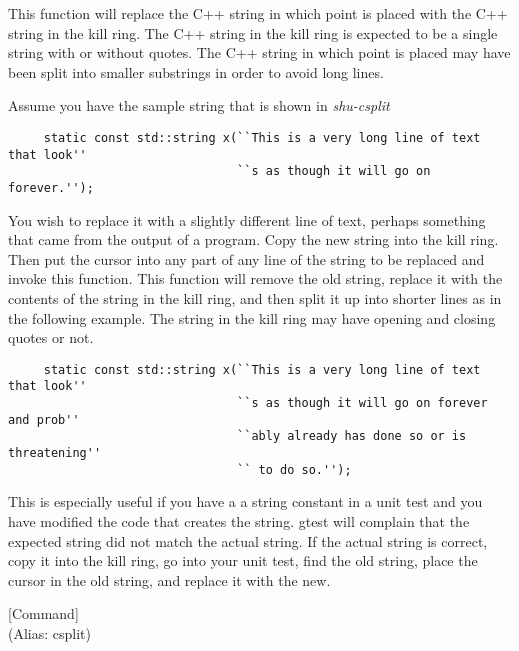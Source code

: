 \begin{doc-string}
This function will replace the C++ string in which point is placed with the
C++ string in the kill ring.  The C++ string in the kill ring is expected to be
a single string with or without quotes.  The C++ string in which point is placed
may have been split into smaller substrings in order to avoid long lines.

Assume you have the sample string that is shown in \emph{shu-csplit}

\small{\begin{verbatim}
     static const std::string x(``This is a very long line of text that look''
                                ``s as though it will go on forever.'');
\end{verbatim}}

You wish to replace it with a slightly different line of text, perhaps something
that came from the output of a program.  Copy the new string into the kill ring.
Then put the cursor into any part of any line of the string to be replaced
and invoke this function.  This function will remove the old string, replace it
with the contents of the string in the kill ring, and then split it up into
shorter lines as in the following example.  The string in the kill ring may have
opening and closing quotes or not.

\small{\begin{verbatim}
     static const std::string x(``This is a very long line of text that look''
                                ``s as though it will go on forever and prob''
                                ``ably already has done so or is threatening''
                                `` to do so.'');
\end{verbatim}}

This is especially useful if you have a a string constant in a unit test and you
have modified the code that creates the string.  gtest will complain that the
expected string did not match the actual string.  If the actual string is
correct, copy it into the kill ring, go into your unit test, find the old
string, place the cursor in the old string, and replace it with the new.
\end{doc-string}

\vspace{1em}
\noindent
{}
\usebox{\funcname}
 \hfill [Command]\\%
 (Alias: csplit)

